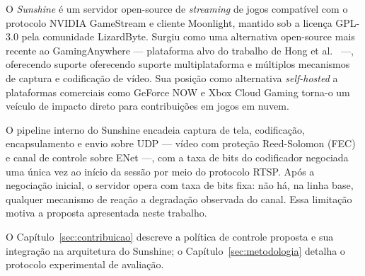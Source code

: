 O \emph{Sunshine} é um servidor open-source de \emph{streaming}
de jogos compatível com o protocolo NVIDIA GameStream e cliente
Moonlight, mantido sob a licença GPL-3.0 pela comunidade
LizardByte. Surgiu como uma alternativa open-source mais recente ao GamingAnywhere — plataforma alvo do trabalho de Hong et al.~\cite{hong2015} —, oferecendo suporte oferecendo suporte multiplataforma e múltiplos mecanismos de captura e codificação de vídeo.
Sua posição como alternativa \emph{self-hosted} a plataformas
comerciais como GeForce NOW e Xbox Cloud Gaming torna-o um
veículo de impacto direto para contribuições em jogos em nuvem.

O pipeline interno do Sunshine encadeia captura de tela,
codificação, encapsulamento e envio sobre UDP — vídeo com
proteção Reed-Solomon (FEC) e canal de controle sobre ENet —,
com a taxa de bits do codificador negociada uma única vez ao
início da sessão por meio do protocolo RTSP. Após a negociação
inicial, o servidor opera com taxa de bits fixa: não há, na
linha base, qualquer mecanismo de reação a degradação observada
do canal. Essa limitação motiva a proposta apresentada neste trabalho.

O Capítulo~\ref{sec:contribuicao} descreve a política de controle
proposta e sua integração na arquitetura do Sunshine; o
Capítulo~\ref{sec:metodologia} detalha o protocolo experimental
de avaliação.
